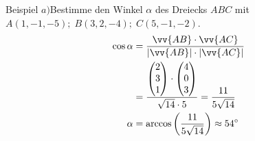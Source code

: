 \documentclass{article}
\begin{document}
    \begin{boxx}[DarkBlue]{Beispiel}
        $a)$\hspace*{3mm}Bestimme den Winkel $\alpha$ des Dreiecks $ABC$ mit $A(1,-1,-5);\;B(3,2,-4);\; C(5,-1,-2)$.
        \begin{align*}
            \cos{\alpha} &= \frac{\vv{AB} \cdot \vv{AC}}{\left|\vv{AB}\right| \cdot \left|\vv{AC}\right|} \\
            &= \frac{\begin{pmatrix}2\\3\\1\end{pmatrix}\cdot \begin{pmatrix}4\\0\\3\end{pmatrix}}{\sqrt{14} \cdot 5} = \frac{11}{5\sqrt{14}} \\
            \alpha &= \arccos{\left(\frac{11}{5\sqrt{14}}\right)} \approx \qty{54}{\degree}
        \end{align*}
    \end{boxx}
    \newpage
\end{document}
